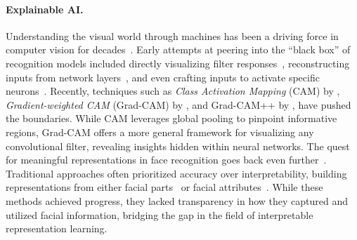 \paragraph{Explainable AI.}

Understanding the visual world through machines has been a driving force in computer vision for decades~\cite{SudderthTFW05,parikh2011human,SinghGE12,JunejaVJZ13,MahendranV16}. 
Early attempts at peering into the ``black box'' of recognition models included directly visualizing filter responses~\cite{ZeilerF14}, 
reconstructing inputs from network layers~\cite{ZeilerTF11}, 
and even crafting inputs to activate specific neurons~\cite{NguyenYC15}.
Recently, techniques such as \textit{Class Activation Mapping} (CAM) by \citet{ZhouKLOT16}, 
\textit{Gradient-weighted CAM} (Grad-CAM) by \citet{SelvarajuCDVPB17}, 
and Grad-CAM++ by \citet{chattopadhay2018grad}, 
have pushed the boundaries. 
While CAM leverages global pooling to pinpoint informative regions, 
Grad-CAM offers a more general framework for visualizing any convolutional filter, 
revealing insights hidden within neural networks.
The quest for meaningful representations in face recognition goes back even further~\cite{ChenHLZ02,learned2016labeled,o2018face}. 
Traditional approaches often prioritized accuracy over interpretability, 
building representations from either facial parts~\cite{CaoYTS10,LiHLBY13} or facial attributes~\cite{KumarBBN09}. 
While these methods achieved progress, 
they lacked transparency in how they captured and utilized facial information, 
bridging the gap in the field of interpretable representation learning. 



